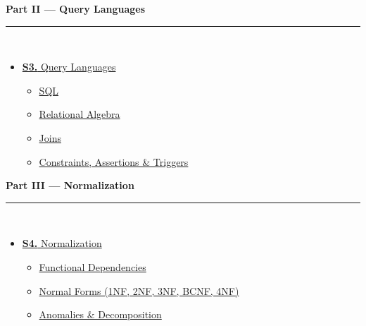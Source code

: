 \documentclass[12pt]{article}
\begin{document}
\begin{tcolorbox}[breakable,colback=cB!5,colframe=cB,boxrule=1pt,arc=5pt,
  left=8pt,right=8pt,top=8pt,bottom=8pt,before skip=4pt]
  {\large\bfseries\textcolor{cB}{Part II --- Query Languages}}\\[5pt]
  \textcolor{cB!40}{\rule{\textwidth}{0.4pt}}\\[3pt]
  \small\begin{itemize}[leftmargin=1.2em,itemsep=1pt,label={\textcolor{cB}{$\triangleright$}}]
    \item \hyperref[sec:S3]{\textbf{S3.} Query Languages}
      \begin{itemize}[leftmargin=1.5em,itemsep=0pt,label={\textcolor{cB}{$\cdot$}}]
        \item \hyperref[sub:s3-sql]{SQL}
        \item \hyperref[sub:s3-relalg]{Relational Algebra}
        \item \hyperref[sub:s3-joins]{Joins}
        \item \hyperref[sub:s3-constraints]{Constraints, Assertions \& Triggers}
      \end{itemize}
  \end{itemize}
\end{tcolorbox}

\begin{tcolorbox}[breakable,colback=cC!5,colframe=cC,boxrule=1pt,arc=5pt,
  left=8pt,right=8pt,top=8pt,bottom=8pt,before skip=4pt]
  {\large\bfseries\textcolor{cC}{Part III --- Normalization}}\\[5pt]
  \textcolor{cC!40}{\rule{\textwidth}{0.4pt}}\\[3pt]
  \small\begin{itemize}[leftmargin=1.2em,itemsep=1pt,label={\textcolor{cC}{$\triangleright$}}]
    \item \hyperref[sec:S4]{\textbf{S4.} Normalization}
      \begin{itemize}[leftmargin=1.5em,itemsep=0pt,label={\textcolor{cC}{$\cdot$}}]
        \item \hyperref[sub:s4-fd]{Functional Dependencies}
        \item \hyperref[sub:s4-nf]{Normal Forms (1NF, 2NF, 3NF, BCNF, 4NF)}
        \item \hyperref[sub:s4-anomaly]{Anomalies \& Decomposition}
      \end{itemize}
  \end{itemize}
\end{tcolorbox}
\end{document}
